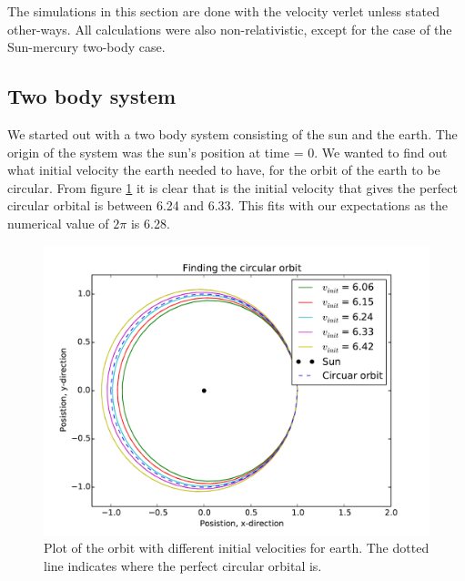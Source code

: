 The simulations in this section are done with the velocity verlet unless stated other-ways. All calculations were also non-relativistic, except for the case of the Sun-mercury two-body case.

\subsection{Two body system}

We started out with a two body system consisting of the sun and the earth. The origin of the system was the sun's position at time = 0. We wanted to find out what initial velocity the earth needed to have, for the orbit of the earth to be circular. From figure \ref{fig:circular_orbit} it is clear that is the initial velocity that gives the perfect circular orbital is between 6.24 and 6.33. This fits with our expectations as the numerical value of $ 2\pi  $ is 6.28. 


\begin{figure}[H]
\includegraphics[width=1\linewidth]{../results/plots/circular_orbit.pdf}\caption{Plot of the orbit with different initial velocities for earth. The dotted line indicates where the perfect circular orbital is.}\label{fig:circular_orbit}
\end{figure}

